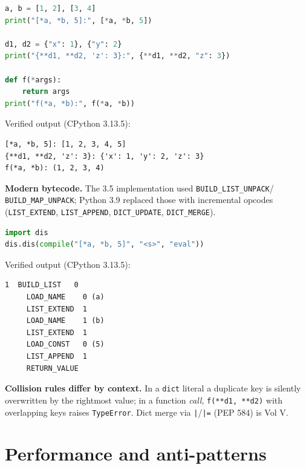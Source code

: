 \begin{lstlisting}[language=Python, caption={Multiple * and ** unpackings in literals and calls.}]
a, b = [1, 2], [3, 4]
print("[*a, *b, 5]:", [*a, *b, 5])

d1, d2 = {"x": 1}, {"y": 2}
print("{**d1, **d2, 'z': 3}:", {**d1, **d2, "z": 3})

def f(*args):
    return args
print("f(*a, *b):", f(*a, *b))
\end{lstlisting}

Verified output (CPython 3.13.5):

\begin{lstlisting}[caption={Output}]
[*a, *b, 5]: [1, 2, 3, 4, 5]
{**d1, **d2, 'z': 3}: {'x': 1, 'y': 2, 'z': 3}
f(*a, *b): (1, 2, 3, 4)
\end{lstlisting}

\textbf{Modern bytecode.} The 3.5 implementation used \texttt{BUILD\_LIST\_UNPACK}/
\texttt{BUILD\_MAP\_UNPACK}; Python 3.9 replaced those with incremental opcodes
(\texttt{LIST\_EXTEND}, \texttt{LIST\_APPEND}, \texttt{DICT\_UPDATE}, \texttt{DICT\_MERGE}).

\begin{lstlisting}[language=Python, caption={3.9+ builds unpacked literals incrementally.}]
import dis
dis.dis(compile("[*a, *b, 5]", "<s>", "eval"))
\end{lstlisting}

Verified output (CPython 3.13.5):

\begin{lstlisting}[caption={Output}]
  1  BUILD_LIST   0
     LOAD_NAME    0 (a)
     LIST_EXTEND  1
     LOAD_NAME    1 (b)
     LIST_EXTEND  1
     LOAD_CONST   0 (5)
     LIST_APPEND  1
     RETURN_VALUE
\end{lstlisting}

\textbf{Collision rules differ by context.} In a \texttt{dict} literal a duplicate key is silently
overwritten by the rightmost value; in a function \emph{call}, \texttt{f(**d1, **d2)} with
overlapping keys raises \texttt{TypeError}. Dict merge via \texttt{|}/\texttt{|=} (PEP 584) is
Vol V.

\section{Performance and anti-patterns}

